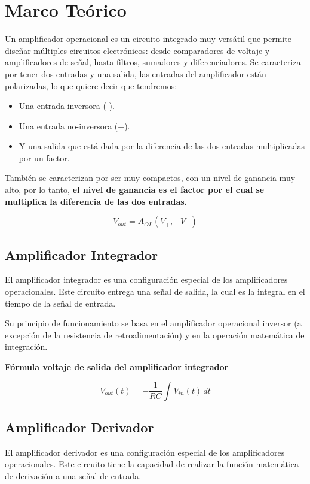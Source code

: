 \documentclass[conference]{IEEEtran}
\begin{document}
\section{Marco Teórico}
Un amplificador operacional es un circuito integrado muy versátil que permite diseñar múltiples circuitos electrónicos: desde comparadores de voltaje y amplificadores de señal, hasta filtros, sumadores y diferenciadores. Se caracteriza por tener dos entradas y una salida, las entradas del amplificador están polarizadas, lo que quiere decir que tendremos:
\begin{itemize}
	\item{Una entrada inversora (-).}
	\item{Una entrada no-inversora (+).}
	\item{Y una salida que está dada por la diferencia de las dos entradas multiplicadas por un factor.}
\end{itemize}

También se caracterizan por ser muy compactos, con un nivel de ganancia muy alto, por lo tanto, \textbf{el nivel de ganancia es el factor por el cual se multiplica la diferencia de las dos entradas.}

\begin{equation}
	V_{out} = A_{OL}(V_+, - V_-)
	\label{eq:amplificador}
\end{equation}


\subsection{Amplificador Integrador}

El amplificador integrador es una configuración especial de los amplificadores operacionales. Este circuito entrega una señal de salida, la cual es la integral en el tiempo de la señal de entrada.

Su principio de funcionamiento se basa en el amplificador operacional inversor (a excepción de la resistencia de retroalimentación) y en la operación matemática de integración.

\textbf{Fórmula voltaje de salida del amplificador integrador}

\begin{equation}
V_{out}(t) = -\frac{1}{RC}\int V_{in}(t)\,dt
\label{eq:integrador}
\end{equation}

\subsection{Amplificador Derivador}
El amplificador derivador es una configuración especial de los amplificadores operacionales. Este circuito tiene la capacidad de realizar la función matemática de derivación a una señal de entrada.
\end{document}
